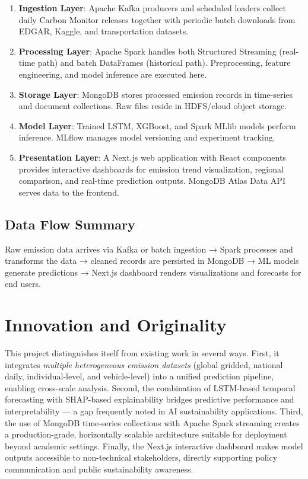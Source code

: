 \documentclass[conference]{IEEEtran}
\begin{document}
\begin{enumerate}
    \item \textbf{Ingestion Layer}: Apache Kafka producers and scheduled loaders collect daily Carbon Monitor releases together with periodic batch downloads from EDGAR, Kaggle, and transportation datasets.
    \item \textbf{Processing Layer}: Apache Spark handles both Structured Streaming (real-time path) and batch DataFrames (historical path). Preprocessing, feature engineering, and model inference are executed here.
    \item \textbf{Storage Layer}: MongoDB stores processed emission records in time-series and document collections. Raw files reside in HDFS/cloud object storage.
    \item \textbf{Model Layer}: Trained LSTM, XGBoost, and Spark MLlib models perform inference. MLflow manages model versioning and experiment tracking.
    \item \textbf{Presentation Layer}: A Next.js web application with React components provides interactive dashboards for emission trend visualization, regional comparison, and real-time prediction outputs. MongoDB Atlas Data API serves data to the frontend.
\end{enumerate}

\subsection{Data Flow Summary}
Raw emission data arrives via Kafka or batch ingestion → Spark processes and transforms the data → cleaned records are persisted in MongoDB → ML models generate predictions → Next.js dashboard renders visualizations and forecasts for end users.

\section{Innovation and Originality}

This project distinguishes itself from existing work in several ways. First, it integrates \textit{multiple heterogeneous emission datasets} (global gridded, national daily, individual-level, and vehicle-level) into a unified prediction pipeline, enabling cross-scale analysis. Second, the combination of LSTM-based temporal forecasting with SHAP-based explainability bridges predictive performance and interpretability — a gap frequently noted in AI sustainability applications. Third, the use of MongoDB time-series collections with Apache Spark streaming creates a production-grade, horizontally scalable architecture suitable for deployment beyond academic settings. Finally, the Next.js interactive dashboard makes model outputs accessible to non-technical stakeholders, directly supporting policy communication and public sustainability awareness.
\end{document}
